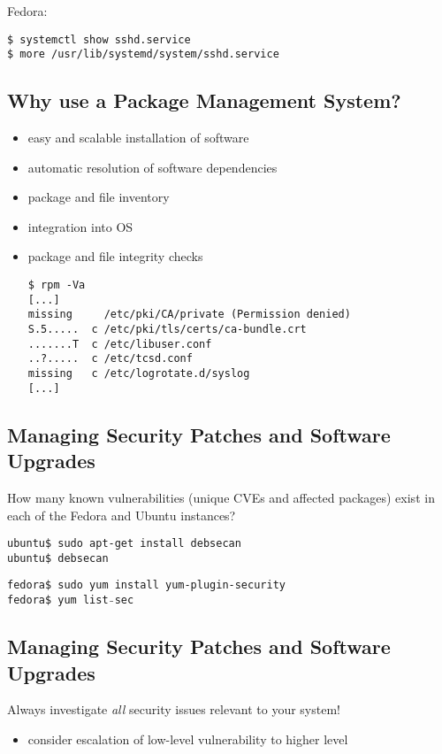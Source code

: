 \documentclass[xga]{xdvislides}
\begin{document}
\vspace{.25in}
Fedora:
\begin{verbatim}
$ systemctl show sshd.service
$ more /usr/lib/systemd/system/sshd.service
\end{verbatim}


\subsection{Why use a Package Management System?}
\begin{itemize}
	\item easy and scalable installation of software
	\item automatic resolution of software dependencies
	\item package and file inventory
	\item integration into OS
	\item package and file integrity checks \\
\begin{verbatim}
$ rpm -Va
[...]
missing     /etc/pki/CA/private (Permission denied)
S.5.....  c /etc/pki/tls/certs/ca-bundle.crt
.......T  c /etc/libuser.conf
..?.....  c /etc/tcsd.conf
missing   c /etc/logrotate.d/syslog
[...]
\end{verbatim}
\end{itemize}

\subsection{Managing Security Patches and Software Upgrades}
How many known vulnerabilities (unique CVEs and affected packages) exist
in each of the Fedora and Ubuntu instances?

\begin{verbatim}
ubuntu$ sudo apt-get install debsecan
ubuntu$ debsecan
\end{verbatim}

\begin{verbatim}
fedora$ sudo yum install yum-plugin-security
fedora$ yum list₋sec
\end{verbatim}

\subsection{Managing Security Patches and Software Upgrades}
Always investigate {\em all} security issues relevant to your system!
\begin{itemize}
	\item consider escalation of low-level vulnerability to higher level
\end{itemize}
\end{document}
